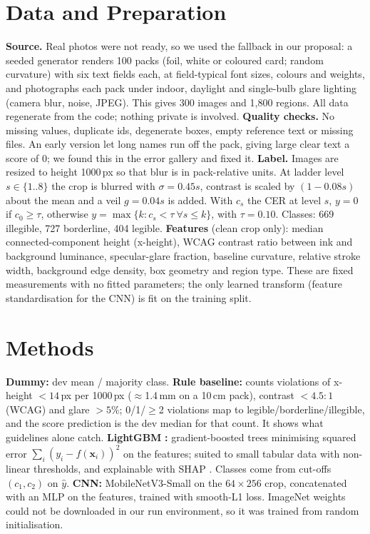 \documentclass{article}
\begin{document}
\section{Data and Preparation}\label{sec:data}
\textbf{Source.} Real photos were not ready, so we used the fallback in our proposal: a seeded generator renders 100 packs
(foil, white or coloured card; random curvature) with six text fields each, at field-typical font sizes, colours and
weights, and photographs each pack under indoor, daylight and single-bulb glare lighting (camera blur, noise, JPEG). This
gives 300 images and 1{,}800 regions. All data regenerate from the code; nothing private is involved.
\textbf{Quality checks.} No missing values, duplicate ids, degenerate boxes, empty reference text or missing files. An early
version let long names run off the pack, giving large clear text a score of 0; we found this in the error gallery and fixed it.
\textbf{Label.} Images are resized to height 1000\,px so that blur is in pack-relative units. At ladder level
$s\in\{1..8\}$ the crop is blurred with $\sigma=0.45s$, contrast is scaled by $(1-0.08s)$ about the mean and a veil
$g=0.04s$ is added. With $c_s$ the CER at level $s$, $y=0$ if $c_0\ge\tau$, otherwise $y=\max\{k: c_s<\tau\ \forall s\le k\}$, with $\tau=0.10$.
Classes: 669 illegible, 727 borderline, 404 legible.
\textbf{Features} (clean crop only): median connected-component height (x-height), WCAG contrast ratio between ink and
background luminance, specular-glare fraction, baseline curvature, relative stroke width, background edge density, box
geometry and region type. These are fixed measurements with no fitted parameters; the only learned transform (feature
standardisation for the CNN) is fit on the training split.

\section{Methods}
\textbf{Dummy:} dev mean / majority class. \textbf{Rule baseline:} counts violations of x-height $<14$\,px per 1000\,px
($\approx$1.4\,mm on a 10\,cm pack), contrast $<4.5{:}1$ (WCAG) and glare $>5\%$; 0/1/$\ge$2 violations map to
legible/borderline/illegible, and the score prediction is the dev median for that count. It shows what guidelines alone catch.
\textbf{LightGBM} \citep{ke2017}\textbf{:} gradient-boosted trees minimising squared error $\sum_i (y_i-f(\mathbf{x}_i))^2$ on the features; suited to
small tabular data with non-linear thresholds, and explainable with SHAP \citep{lundberg2017}. Classes come from cut-offs
$(c_1,c_2)$ on $\hat y$. \textbf{CNN:} MobileNetV3-Small \citep{howard2019} on the $64\times256$ crop, concatenated with an
MLP on the features, trained with smooth-L1 loss. ImageNet weights could not be downloaded in our run environment, so it
was trained from random initialisation.
\end{document}
